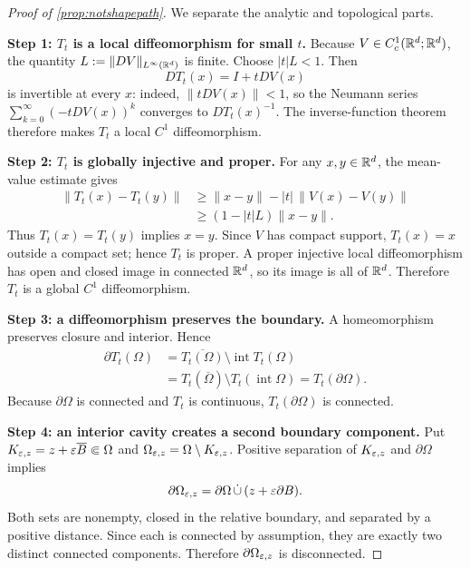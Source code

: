 \begin{proof}[Proof of \cref{prop:notshapepath}]
We separate the analytic and topological parts.

\textbf{Step 1: $T_t$ is a local diffeomorphism for small $t$.}
Because $V\in C^1_c(\mathbb{R}^d;\mathbb{R}^d)$, the quantity
$L:=\|DV\|_{L^\infty(\mathbb{R}^d)}$ is finite.  Choose $|t|L<1$.  Then
\begin{equation}
 DT_t(x)=I+tDV(x)
\end{equation}
is invertible at every $x$: indeed,
$\|tDV(x)\|<1$, so the Neumann series
$\sum_{k=0}^{\infty}(-tDV(x))^k$ converges to $DT_t(x)^{-1}$.
The inverse-function theorem therefore makes $T_t$ a local $C^1$
diffeomorphism.

\textbf{Step 2: $T_t$ is globally injective and proper.}
For any $x,y\in\mathbb{R}^d$, the mean-value estimate gives
\begin{align}
 \|T_t(x)-T_t(y)\|
 &\ge \|x-y\|-|t|\,\|V(x)-V(y)\|\\
 &\ge (1-|t|L)\|x-y\|.
 \label{eq:bilipschitzlower}
\end{align}
Thus $T_t(x)=T_t(y)$ implies $x=y$.  Since $V$ has compact support,
$T_t(x)=x$ outside a compact set; hence $T_t$ is proper.  A proper injective
local diffeomorphism has open and closed image in connected $\mathbb{R}^d$, so its
image is all of $\mathbb{R}^d$.  Therefore $T_t$ is a global $C^1$ diffeomorphism.

\textbf{Step 3: a diffeomorphism preserves the boundary.}
A homeomorphism preserves closure and interior.  Hence
\begin{align}
 \partial T_t(\Omega)
 &=\overline{T_t(\Omega)}\setminus\operatorname{int}T_t(\Omega)\\
 &=T_t(\overline\Omega)\setminus T_t(\operatorname{int}\Omega)
 =T_t(\partial\Omega).
 \label{eq:boundarymapped}
\end{align}
Because $\partial\Omega$ is connected and $T_t$ is continuous,
$T_t(\partial\Omega)$ is connected.

\textbf{Step 4: an interior cavity creates a second boundary component.}
Put $K_{\varepsilon,z}=z+\varepsilon\overline B\Subset\Omega$ and
$\Omega_{\varepsilon,z}=\Omega\setminus K_{\varepsilon,z}$.  Positive separation of
$K_{\varepsilon,z}$ and $\partial\Omega$ implies
\begin{equation}
 \partial\Omega_{\varepsilon,z}
 =\partial\Omega\,\dot\cup\,(z+\varepsilon\partial B).
 \label{eq:perforatedboundary}
\end{equation}
Both sets are nonempty, closed in the relative boundary, and separated by a
positive distance.  Since each is connected by assumption, they are exactly
two distinct connected components.  Therefore
$\partial\Omega_{\varepsilon,z}$ is disconnected.


\end{proof}
